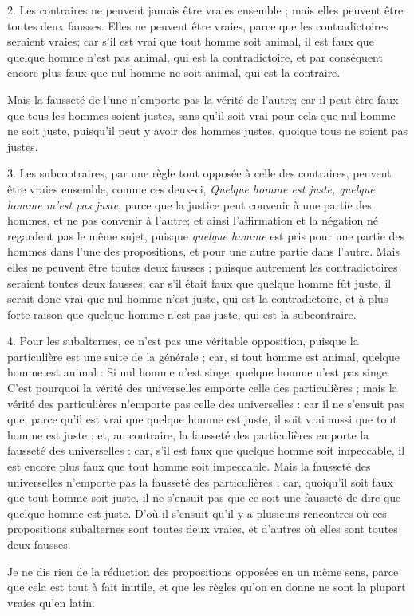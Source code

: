 \bigbreak
{$2$.} Les contraires ne peuvent jamais être vraies ensemble ; mais elles peuvent être toutes deux fausses. Elles ne peuvent être vraies, parce que les contradictoires seraient vraies; car s'il est vrai que tout homme soit animal, il est faux que quelque homme n'est pas animal, qui est la contradictoire, et par conséquent encore plus faux que nul homme ne soit animal, qui est la contraire.

Mais la fausseté de l'une n'emporte pas la vérité de l'autre; car il peut être faux que tous les hommes soient justes, sans qu'il soit vrai pour cela que nul homme ne soit juste, puisqu'il peut y avoir des hommes justes, quoique tous ne soient pas justes.

\bigbreak
{$3$.} Les subcontraires, par une règle tout opposée à celle des contraires, peuvent être vraies ensemble, comme ces deux-ci, \emph{Quelque homme est juste, quelque homme m'est pas juste}, parce que la justice peut convenir à une partie des hommes, et ne pas convenir à l'autre; et ainsi l'affirmation et la négation né regardent pas le même sujet, puisque \emph{quelque homme} est pris pour une partie des hommes dans l'une des propositions, et pour une autre partie dans l'autre. Mais elles ne peuvent être toutes deux fausses ; puisque autrement les contradictoires seraient toutes deux fausses, car s'il était faux que quelque homme fût juste, il serait donc vrai que nul homme n'est juste, qui est la contradictoire, et à plus forte raison que quelque homme n'est pas juste, qui est la subcontraire.

\bigbreak
{$4$.} Pour les subalternes, ce n'est pas une véritable opposition, puisque la particulière est une suite de la générale ; car, si tout homme est animal, quelque homme est animal : Si nul homme n'est singe, quelque homme n'est pas singe. C'est pourquoi la vérité des universelles emporte celle des particulières ; mais la vérité des particulières n'emporte pas celle des universelles : car il ne s'ensuit pas que, parce qu'il est vrai que quelque homme est juste, il soit vrai aussi que tout homme est juste ; et, au contraire, la fausseté des particulières emporte la fausseté des universelles : car, s'il est faux que quelque homme soit impeccable, il est encore plus faux que tout homme soit impeccable. Mais la fausseté des universelles n'emporte pas la fausseté des particulières ; car, quoiqu'il soit faux que tout homme soit juste, il ne s'ensuit pas que ce soit une fausseté de dire que quelque homme est juste. D'où il s'ensuit qu'il y a plusieurs rencontres où ces propositions subalternes sont toutes deux vraies, et d'autres où elles sont toutes deux fausses.

\bigbreak
Je ne dis rien de la réduction des propositions opposées en un même sens, parce que cela est tout à fait inutile, et que les règles qu'on en donne ne sont la plupart vraies qu'en latin.
